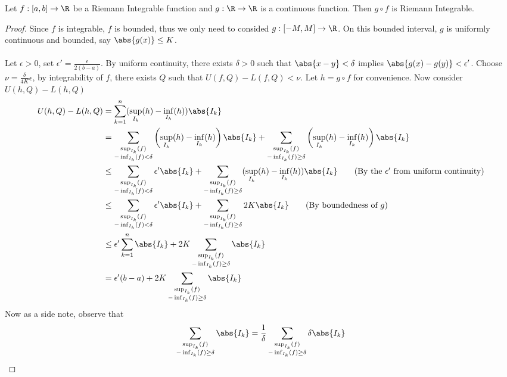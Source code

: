 \begin{thm}{}{} Let $f:[a,b]\to\R$ be a Riemann Integrable function and $g:\R\to\R$ is a continuous function. Then $g\circ f$ is Riemann Integrable. \tcbline
\begin{proof} Since $f$ is integrable, $f$ is bounded, thus we only need to consided $g:[-M,M]\to\R$. On this bounded interval, $g$ is uniformly continuous and bounded, say $\abs{g(x)}\leq K$. \\~\\
Let $\epsilon>0$, set $\epsilon'=\frac{\epsilon}{2(b-a)}$. By uniform continuity, there exists $\delta>0$ such that $\abs{x-y}<\delta$ implies $\abs{g(x)-g(y)}<\epsilon'$. Choose $\nu=\frac{\delta}{4K}\epsilon$, by integrability of $f$, there exists $Q$ such that $U(f,Q)-L(f,Q)<\nu$. Let $h=g\circ f$ for convenience. Now consider $U(h,Q)-L(h,Q)$
\begin{align*}
U(h,Q)-L(h,Q)&=\sum_{k=1}^n(\sup_{I_k}(h)-\inf_{I_k}(h))\abs{I_k}\\
&=\sum_{\substack{\sup_{I_k}(f)\\-\inf_{I_k}(f)<\delta}}\left(\sup_{I_k}(h)-\inf_{I_k}(h)\right)\abs{I_k}+\sum_{\substack{\sup_{I_k}(f)\\-\inf_{I_k}(f)\geq\delta}}\left(\sup_{I_k}(h)-\inf_{I_k}(h)\right)\abs{I_k}\\
&\leq\sum_{\substack{\sup_{I_k}(f)\\-\inf_{I_k}(f)<\delta}}\epsilon'\abs{I_k}+\sum_{\substack{\sup_{I_k}(f)\\-\inf_{I_k}(f)\geq\delta}}(\sup_{I_k}(h)-\inf_{I_k}(h))\abs{I_k}\tag{By the $\epsilon'$ from uniform continuity}\\
&\leq\sum_{\substack{\sup_{I_k}(f)\\-\inf_{I_k}(f)<\delta}}\epsilon'\abs{I_k}+\sum_{\substack{\sup_{I_k}(f)\\-\inf_{I_k}(f)\geq\delta}}2K\abs{I_k}\tag{By boundedness of $g$}\\
&\leq\epsilon'\sum_{k=1}^n\abs{I_k}+2K\sum_{\substack{\sup_{I_k}(f)\\-\inf_{I_k}(f)\geq\delta}}\abs{I_k}\\
&=\epsilon'(b-a)+2K\sum_{\substack{\sup_{I_k}(f)\\-\inf_{I_k}(f)\geq\delta}}\abs{I_k}
\end{align*}
Now as a side note, observe that
\begin{align*}
\sum_{\substack{\sup_{I_k}(f)\\-\inf_{I_k}(f)\geq\delta}}\abs{I_k}&=\frac{1}{\delta}\sum_{\substack{\sup_{I_k}(f)\\-\inf_{I_k}(f)\geq\delta}}\delta\abs{I_k}\\

\end{align*}
\end{proof}
\end{thm}
